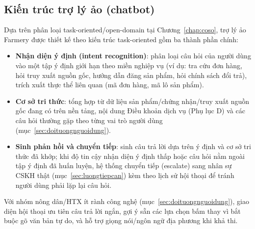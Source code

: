 \subsection{Kiến trúc trợ lý ảo (chatbot)}

Dựa trên phân loại task-oriented/open-domain tại Chương~\ref{chap:coso}, trợ lý ảo Farmery được thiết kế theo kiến trúc task-oriented gồm ba thành phần chính:
\begin{itemize}
    \item \textbf{Nhận diện ý định (intent recognition)}: phân loại câu hỏi của người dùng vào một tập ý định giới hạn theo miền nghiệp vụ (ví dụ: tra cứu đơn hàng, hỏi truy xuất nguồn gốc, hướng dẫn đăng sản phẩm, hỏi chính sách đổi trả), trích xuất thực thể liên quan (mã đơn hàng, mã lô sản phẩm).
    \item \textbf{Cơ sở tri thức}: tổng hợp từ dữ liệu sản phẩm/chứng nhận/truy xuất nguồn gốc đang có trên nền tảng, nội dung Điều khoản dịch vụ (Phụ lục D) và các câu hỏi thường gặp theo từng vai trò người dùng (mục~\ref{sec:doituongnguoidung}).
    \item \textbf{Sinh phản hồi và chuyển tiếp}: sinh câu trả lời dựa trên ý định và cơ sở tri thức đã khớp; khi độ tin cậy nhận diện ý định thấp hoặc câu hỏi nằm ngoài tập ý định đã huấn luyện, hệ thống chuyển tiếp (escalate) sang nhân sự CSKH thật (mục~\ref{sec:luongtiepcan}) kèm theo lịch sử hội thoại để tránh người dùng phải lặp lại câu hỏi.
\end{itemize}
Với nhóm nông dân/HTX ít rành công nghệ (mục~\ref{sec:doituongnguoidung}), giao diện hội thoại ưu tiên câu trả lời ngắn, gợi ý sẵn các lựa chọn bấm thay vì bắt buộc gõ văn bản tự do, và hỗ trợ giọng nói/ngôn ngữ địa phương khi khả thi.

